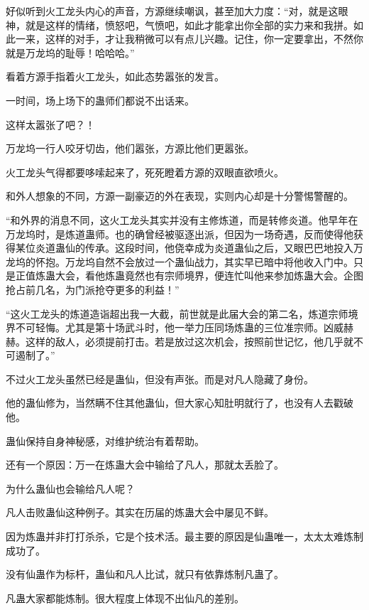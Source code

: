 
\begin{this_body}

好似听到火工龙头内心的声音，方源继续嘲讽，甚至加大力度：“对，就是这眼神，就是这样的情绪，愤怒吧，气愤吧，如此才能拿出你全部的实力来和我拼。如此一来，这样的对手，才让我稍微可以有点儿兴趣。记住，你一定要拿出，不然你就是万龙坞的耻辱！哈哈哈。”

看着方源手指着火工龙头，如此态势嚣张的发言。

一时间，场上场下的蛊师们都说不出话来。

这样太嚣张了吧？！

万龙坞一行人咬牙切齿，他们嚣张，方源比他们更嚣张。

火工龙头气得都要哆嗦起来了，死死瞪着方源的双眼直欲喷火。

和外人想象的不同，方源一副豪迈的外在表现，实则内心却是十分警惕警醒的。

“和外界的消息不同，这火工龙头其实并没有主修炼道，而是转修炎道。他早年在万龙坞时，是炼道蛊师。也的确曾经被驱逐出派，但因为一场奇遇，反而使得他获得某位炎道蛊仙的传承。这段时间，他侥幸成为炎道蛊仙之后，又眼巴巴地投入万龙坞的怀抱。万龙坞自然不会放过一个蛊仙战力，其实早已暗中将他收入门中。只是正值炼蛊大会，看他炼蛊竟然也有宗师境界，便连忙叫他来参加炼蛊大会。企图抢占前几名，为门派抢夺更多的利益！”

“这火工龙头的炼道造诣超出我一大截，前世就是此届大会的第二名，炼道宗师境界不可轻悔。尤其是第十场武斗时，他一举力压同场炼蛊的三位准宗师。凶威赫赫。这样的敌人，必须提前打击。若是放过这次机会，按照前世记忆，他几乎就不可遏制了。”

不过火工龙头虽然已经是蛊仙，但没有声张。而是对凡人隐藏了身份。

他的蛊仙修为，当然瞒不住其他蛊仙，但大家心知肚明就行了，也没有人去戳破他。

蛊仙保持自身神秘感，对维护统治有着帮助。

还有一个原因：万一在炼蛊大会中输给了凡人，那就太丢脸了。

为什么蛊仙也会输给凡人呢？

凡人击败蛊仙这种例子。其实在历届的炼蛊大会中屡见不鲜。

因为炼蛊并非打打杀杀，它是个技术活。最主要的原因是仙蛊唯一，太太太难炼制成功了。

没有仙蛊作为标杆，蛊仙和凡人比试，就只有依靠炼制凡蛊了。

凡蛊大家都能炼制。很大程度上体现不出仙凡的差别。


\end{this_body}
